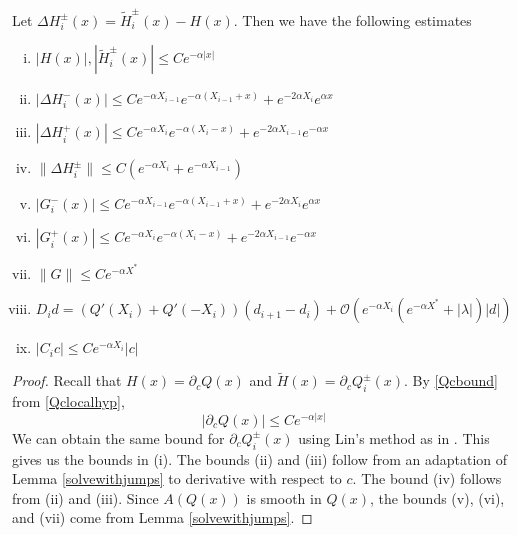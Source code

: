 \documentclass[thesis.tex]{subfiles}
\begin{document}
\begin{lemma}\label{stabestimateslemma}
Let $\Delta H_i^\pm(x) = \tilde{H}_i^\pm(x) - H(x)$. Then we have the following estimates
\begin{enumerate}[(i)]
\item $|H(x)|, |\tilde{H}_i^\pm(x)| \leq C e^{-\alpha |x|}$
\item $|\Delta H_i^-(x)| \leq C e^{-\alpha X_{i-1}} e^{-\alpha(X_{i-1} + x) } + e^{-2 \alpha X_i} e^{\alpha x}$
\item $|\Delta H_i^+(x)| \leq C e^{-\alpha X_i} e^{-\alpha(X_i - x) } + e^{-2 \alpha X_{i-1}} e^{-\alpha x}$
\item $\|\Delta H_i^\pm\| \leq C(e^{-\alpha X_i} + e^{-\alpha X_{i-1}} )$
\item $|G_i^-(x)| \leq C e^{-\alpha X_{i-1}} e^{-\alpha(X_{i-1} + x) } + e^{-2 \alpha X_i} e^{\alpha x}$
\item $|G_i^+(x)| \leq C e^{-\alpha X_i} e^{-\alpha(X_i - x) } + e^{-2 \alpha X_{i-1}} e^{-\alpha x}$
\item $\|G\| \leq C e^{-\alpha X^*}$
\item $D_i d = ( Q'(X_i) + Q'(-X_i))(d_{i+1} - d_i ) + \mathcal{O} ( e^{-\alpha X_i} (e^{-\alpha X^*} + |\lambda| )|d|)$
\item $|C_i c| \leq C e^{-\alpha X_i} |c|$
\end{enumerate}
\begin{proof}
Recall that $H(x) = \partial_c Q(x)$ and $\tilde{H}(x) = \partial_c Q_i^\pm(x)$. By \cref{Qcbound} from \cref{Qclocalhyp},
\begin{equation}\label{Qcbound1}
|\partial_c Q(x)| \leq C e^{-\alpha|x|}
\end{equation}
We can obtain the same bound for $\partial_c Q_i^\pm(x)$ using Lin's method as in \cite{SandstedeStrut,Sandstede1993}. This gives us the bounds in (i). The bounds (ii) and (iii) follow from an adaptation of Lemma \ref{solvewithjumps} to derivative with respect to $c$. The bound (iv) follows from (ii) and (iii). Since $A(Q(x))$ is smooth in $Q(x)$, the bounds (v), (vi), and (vii) come from Lemma \ref{solvewithjumps}. 


\end{proof}
\end{lemma}
\end{document}
